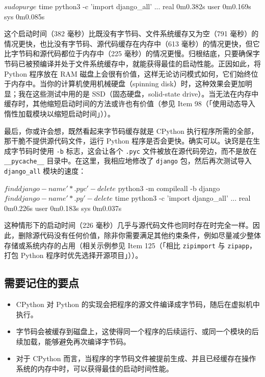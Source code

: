 \begin{codebox}[python]
$ sudo purge
$ time python3 -c 'import django_all'
...
real    0m0.382s
user    0m0.169s
sys     0m0.085s
\end{codebox}

这个启动时间（382 毫秒）比既没有字节码、文件系统缓存又为空（791 毫秒）的情况更快，也比没有字节码、源代码缓存在内存中（613 毫秒）的情况更快，但它比字节码和源代码都位于内存中（225 毫秒）的情况更慢。归根结底，只要确保字节码已被预编译并处于文件系统缓存中，就能获得最佳的启动性能。正因如此，将 Python 程序放在 RAM 磁盘上会很有价值，这样无论访问模式如何，它们始终位于内存中。当你的计算机使用机械硬盘（spinning disk）时，这种效果会更加明显；我在这些测试中用的是 SSD（固态硬盘，solid-state drive）。当无法在内存中缓存时，其他缩短启动时间的方法或许也有价值（参见 Item 98（「使用动态导入惰性加载模块以缩短启动时间」））。

最后，你或许会想，既然看起来字节码缓存就是 CPython 执行程序所需的全部，那干脆不提供源代码文件，运行 Python 程序是否会更快。确实可以。诀窍是在生成字节码时使用 \texttt{-b} 标志，这会让各个 \texttt{.pyc} 文件被放在源代码旁边，而不是放在 \texttt{\_\_pycache\_\_} 目录中。在这里，我相应地修改了 \texttt{django} 包，然后再次测试导入 \texttt{django\_all} 模块的速度：

\begin{codebox}[python]
$ find django -name '*.pyc' -delete
$ python3 -m compileall -b django
$ find django -name '*.py' -delete
$ time python3 -c 'import django_all'
...
real    0m0.226s
user    0m0.183s
sys     0m0.037s
\end{codebox}

这种情形下的启动时间（226 毫秒）几乎与源代码文件也同时存在时完全一样。因此，删除源代码没有任何价值，除非你需要满足其他约束条件，例如尽量减少整体存储或系统内存的占用（相关示例参见 Item 125（「相比 \texttt{zipimport} 与 \texttt{zipapp}，打包 Python 程序时优先选择开源项目」））。

\subsection{需要记住的要点}

\begin{itemize}
\item CPython 对 Python 的实现会把程序的源文件编译成字节码，随后在虚拟机中执行。
\item 字节码会被缓存到磁盘上，这使得同一个程序的后续运行、或同一个模块的后续加载，能够避免再次编译字节码。
\item 对于 CPython 而言，当程序的字节码文件被提前生成、并且已经缓存在操作系统的内存中时，可以获得最佳的启动时间性能。
\end{itemize}

